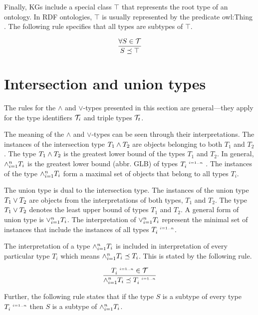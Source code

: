 \documentclass[runningheads]{llncs}
\newcommand{\s}{\scriptscriptstyle\ \,}
\newcommand{\T}{{\cal T}}
\begin{document}
Finally, KGs include a special class $\top$ that represents the root
type of an ontology. In RDF ontologies, $\top$ is usually represented
by the predicate owl:Thing \cite{Hoffart2013}. The following rule
specifies that all types are subtypes of $\top$.

\begin{equation}
\dfrac{\forall\/S\in\T}
      {S\preceq\top}
\end{equation}






\section{Intersection and union types\label{sec:intsc-union}}

The rules for the $\land$ and $\lor$-types presented in this section
are general---they apply for the type identifiers $\T_i$ and triple
types $\T_t$.

The meaning of the $\land$ and $\lor$-types can be seen through their
interpretations. The instances of the intersection type
$T_1\land\/T_2$ are objects belonging to both $T_1$ and $T_2$. The
type $T_1\land\/T_2$ is the greatest lower bound of the types $T_1$
and $T_2$. In general, $\land_{i=1}^n\/T_i$ is the greatest lower
bound (abbr. GLB) of types $T_i^{\s\/i=1..n}$
\cite{Pierce1991,Pierce1996}. The instances of the type
$\land_{i=1}^n\/T_i$ form a maximal set of objects that belong to all
types $T_i$.

The union type is dual to the intersection type. The instances of the
union type $T_1\lor\/T_2$ are objects from the interpretations of both
types, $T_1$ and $T_2$. The type $T_1\lor\/T_2$ denotes the least
upper bound of types $T_1$ and $T_2$. A general form of union type is
$\lor_{i=1}^n\/T_i$. The interpretation of $\lor_{i=1}^n\/T_i$
represent the minimal set of instances that include the instances of
all types $T_i^{\s\/i=1..n}$.

The interpretation of a type $\land_{i=1}^n\/T_i$ is included in
interpretation of every particular type $T_i$ which means
$\land_{i=1}^n\/T_i\preceq\/T_i$. This is stated by the following
rule.

\begin{equation}
\label{rul:land-preceq-elems}
\dfrac{T_i^{\s\/i=1..n}\in\T}
      {\land_{i=1}^n\/T_i\preceq\/T_i^{\s\/i=1..n}} 
\end{equation}

Further, the following rule states that if the type $S$ is a subtype
of every type $T_i^{\s\/i=1..n}$ then $S$ is a subtype of
$\land_{i=1}^n\/T_i$.
\end{document}
